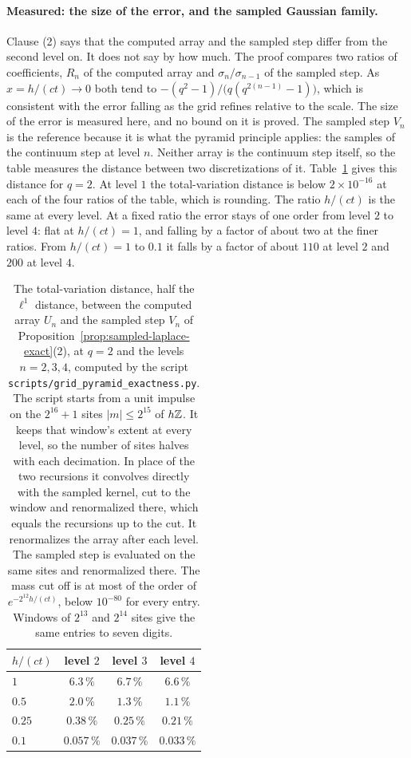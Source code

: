 \paragraph{Measured: the size of the error, and the sampled Gaussian family.} Clause (2) says that
the computed array and the sampled step differ from the second level on. It does not say by how
much. The proof compares two ratios of coefficients, $R_n$ of the computed array and
$\sigma_n/\sigma_{n-1}$ of the sampled step. As $x = h/(ct) \to 0$ both tend to
$-(q^2 - 1)/\bigl(q(q^{2(n-1)} - 1)\bigr)$, which is consistent with the error falling as the grid
refines relative to the scale. The size of the error is measured here, and no bound on it is
proved. The sampled step $V_n$ is the reference because it is what the pyramid principle applies:
the samples of the continuum step at level $n$. Neither array is the continuum step itself, so the
table measures the distance between two discretizations of it. Table~\ref{tab:grid-pyramid-error}
gives this distance for $q = 2$. At level $1$ the
total-variation distance is below $2 \times 10^{-16}$ at each of the four ratios of the table,
which is rounding. The ratio $h/(ct)$ is the same at every level. At a fixed ratio the
error stays of one order from level $2$ to level $4$: flat at $h/(ct) = 1$, and falling by a factor
of about two at the finer ratios. From $h/(ct) = 1$ to $0.1$ it falls by a factor of about $110$ at
level $2$ and $200$ at level $4$.

\begin{table}[ht]
\centering
\begin{tabular}{lccc}
$h/(ct)$ & level $2$ & level $3$ & level $4$ \\
\hline
$1$ & $6.3\,\%$ & $6.7\,\%$ & $6.6\,\%$ \\
$0.5$ & $2.0\,\%$ & $1.3\,\%$ & $1.1\,\%$ \\
$0.25$ & $0.38\,\%$ & $0.25\,\%$ & $0.21\,\%$ \\
$0.1$ & $0.057\,\%$ & $0.037\,\%$ & $0.033\,\%$ \\
\end{tabular}
\caption{The total-variation distance, half the $\ell^1$ distance, between the computed array
$U_n$ and the sampled step $V_n$ of Proposition~\ref{prop:sampled-laplace-exact}(2), at $q = 2$
and the levels $n = 2, 3, 4$, computed by the script
\texttt{scripts/grid\_pyramid\_exactness.py}. The script starts from a unit impulse on the
$2^{16} + 1$ sites $|m| \le 2^{15}$ of $h\mathbb{Z}$. It keeps that window's extent at every level, so the
number of sites halves with each decimation. In place of the two recursions it convolves directly
with the sampled kernel, cut to the window and renormalized there, which equals the recursions up to
the cut. It renormalizes the array after each level. The sampled step is evaluated on the same sites
and renormalized there. The mass cut off is at most of the order of $e^{-2^{12}h/(ct)}$, below
$10^{-80}$ for every entry. Windows of $2^{13}$ and $2^{14}$ sites give the same entries to seven
digits.}
\label{tab:grid-pyramid-error}
\end{table}

